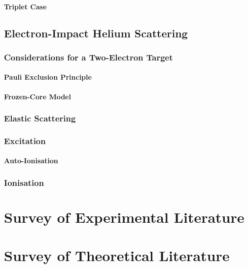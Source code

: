 \documentclass[draft]{article}
\begin{document}
\paragraph{Triplet Case}

\subsection{Electron-Impact Helium Scattering}
\label{sec:e-he}

\subsubsection{Considerations for a Two-Electron Target}
\label{sec:2e-target}

\paragraph{Pauli Exclusion Principle}

\paragraph{Frozen-Core Model}

\subsubsection{Elastic Scattering}
\label{sec:e-he-elastic-scattering}

\subsubsection{Excitation}
\label{sec:e-he-excitation}

\paragraph{Auto-Ionisation}

\subsubsection{Ionisation}
\label{sec:e-he-ionisation}

\section{Survey of Experimental Literature}
\label{sec:survey-experimental}

\section{Survey of Theoretical Literature}
\label{sec:survey-theoretical}
\end{document}
